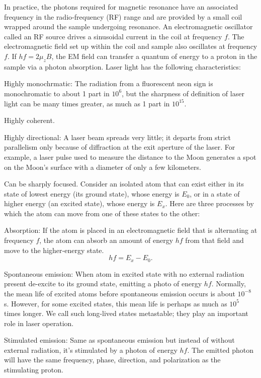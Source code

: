 \documentclass[a4paper,12pt]{report}
\begin{document}
In practice, the photons required for magnetic resonance have an associated frequency in the radio‑frequency (RF) range and are provided by a small coil wrapped around the sample undergoing resonance. An electromagnetic oscillator called an RF source drives a sinusoidal current in the coil at frequency $f$. The electromagnetic field set up within the coil and sample also oscillates at frequency $f$. If $hf=2\mu_zB$, the EM field can transfer a quantum of energy to a proton in the sample via a photon absorption.
Laser light has the following characteristics:
\bit
\item Highly monochrmatic: The radiation from a fluorescent neon sign is monochromatic to about 1 part in $10^6$, but the sharpness of definition of laser light can be many times greater, as much as 1 part in $10^{15}$.
\item Highly coherent.
\item Highly directional: A laser beam spreads very little; it departs from strict parallelism only because of diffraction at the exit aperture of the laser. For example, a laser pulse used to measure the distance to the Moon generates a spot on the Moon's surface with a diameter of only a few kilometers.
\item Can be sharply focused.
\eit
{}
Consider an isolated atom that can exist either in its state of lowest energy (its ground state), whose energy is $E_0$, or in a state of higher energy (an excited state), whose energy is $E_x$. Here are three processes by which the atom can move from one of these states to the other:
\bit
\item Absorption: If the atom is placed in an electromagnetic field that is alternating at frequency $f$, the atom can absorb an amount of energy $hf$ from that field and move to the higher‑energy state.
\[hf=E_x-E_0.\]
\item Spontaneous emission: When atom in excited state with no external radiation present de-excite to its ground state, emitting a photo of energy $hf$. Normally, the mean life of excited atoms before spontaneous emission  occurs is about $10^{-8}$ s. However, for some excited states, this mean life is perhaps as much as $10^5$ times longer. We call such long‑lived states metastable; they play an important role in laser operation.
\item Stimulated emission: Same as spontaneous emission but instead of without external radiation, it's stimulated by a photon of energy $hf$. The emitted photon will have the same frequency, phase, direction, and polarization as the stimulating proton.
\end{document}
